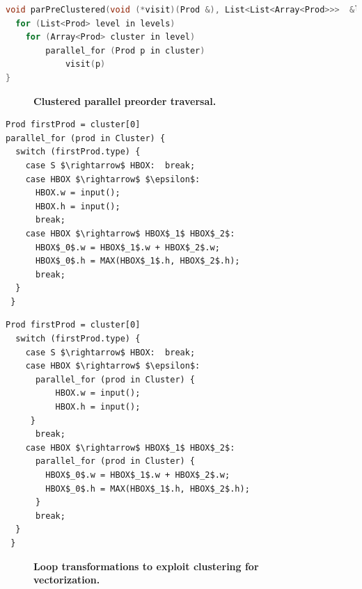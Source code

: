 \newsavebox{\bfsClusteredVisitor}
\begin{lrbox}{\bfsClusteredVisitor}%
\begin{lstlisting}[mathescape,language=C++,morekeywords={spawn,join,reverse,parallel_for}]
void parPreClustered(void (*visit)(Prod &), List<List<Array<Prod>>>  &levels) {
  for (List<Prod> level in levels)
  	for (Array<Prod> cluster in level)
  		parallel_for (Prod p in cluster)
			visit(p)
}
\end{lstlisting}
\end{lrbox}

\begin{figure}
 \usebox{\bfsClusteredVisitor}  
\caption{\textbf{Clustered parallel preorder traversal.}}
\label{fig:clusteredeval}
\end{figure}


\newsavebox{\clusterUnswitchA}
\begin{lrbox}{\clusterUnswitchA}%
\begin{lstlisting}[mathescape]
Prod firstProd = cluster[0]
parallel_for (prod in Cluster) {
  switch (firstProd.type) {
    case S $\rightarrow$ HBOX:  break;
    case HBOX $\rightarrow$ $\epsilon$:
      HBOX.w = input(); 
      HBOX.h = input(); 
      break;
    case HBOX $\rightarrow$ HBOX$_1$ HBOX$_2$:
      HBOX$_0$.w = HBOX$_1$.w + HBOX$_2$.w;
      HBOX$_0$.h = MAX(HBOX$_1$.h, HBOX$_2$.h);
      break;
  }
 }
\end{lstlisting}
\end{lrbox}

\newsavebox{\clusterUnswitchB}
\begin{lrbox}{\clusterUnswitchB}%
\begin{lstlisting}[mathescape]
Prod firstProd = cluster[0]
  switch (firstProd.type) {
    case S $\rightarrow$ HBOX:  break;
    case HBOX $\rightarrow$ $\epsilon$:
      parallel_for (prod in Cluster) {
          HBOX.w = input(); 
          HBOX.h = input();
     }
      break;
    case HBOX $\rightarrow$ HBOX$_1$ HBOX$_2$:
      parallel_for (prod in Cluster) {
        HBOX$_0$.w = HBOX$_1$.w + HBOX$_2$.w;
        HBOX$_0$.h = MAX(HBOX$_1$.h, HBOX$_2$.h);
      }
      break;
  }
 }
\end{lstlisting}
\end{lrbox}



\begin{figure}
\caption{\textbf{Loop transformations to exploit clustering for vectorization.}}
\label{fig:clusteringunswitching}
\end{figure}


